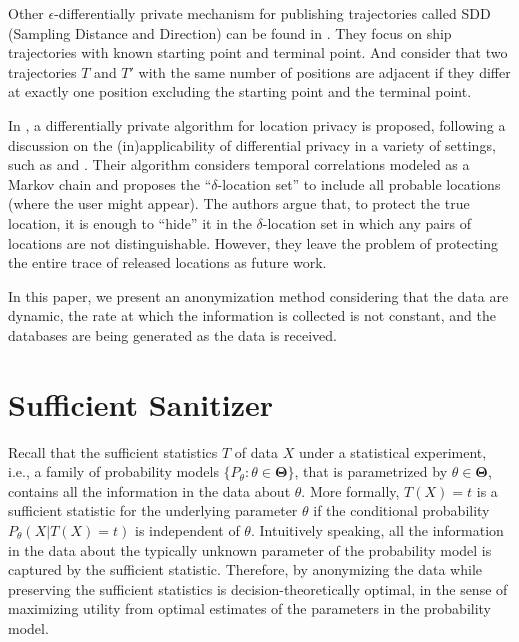 \documentclass{llncs}
\begin{document}
Other $\epsilon$-differentially private mechanism for publishing trajectories called SDD (Sampling Distance and Direction) can be found in \cite{Jiang:2013}.
They focus on ship trajectories with known starting point and terminal point.
And consider that two trajectories $T$ and $T'$ with the same number of positions are adjacent if they differ at exactly one position excluding the starting point and the terminal point.


In \cite{Xiao:2015}, a differentially private algorithm for location privacy is proposed, following a discussion on the (in)applicability of differential privacy in a variety of settings, such as \cite{Chatzik:2013} and  \cite{Kifer:2011}.
Their algorithm considers temporal correlations modeled as a Markov chain and proposes the ``$\delta$-location set'' to include all probable locations (where the user might appear). The authors argue that, to protect the true location, it is enough to “hide” it in the $\delta$-location set in which any pairs of locations are not distinguishable.
However, they leave the problem of protecting the entire trace of released locations as future work.


In this paper, we present an anonymization method considering that the data are dynamic, the rate at which the information is collected is not constant, and the databases are being generated as the data is received.


\section{Sufficient Sanitizer}\label{S:SufficientSanitizer}

Recall that the sufficient statistics $T$ of data $X$ under a statistical experiment, i.e., a family of probability models $\{P_{\theta}: \theta \in \mathbf{\Theta}\}$, that is parametrized by $\theta \in \mathbf{\Theta}$, contains all the information in the data about $\theta$.  
More formally, $T(X)=t$ is a sufficient statistic for the underlying parameter $\theta$ if the conditional probability $P_{\theta}(X | T(X)=t)$ is independent of $\theta$.  
Intuitively speaking, all the information in the data about the typically unknown parameter of the probability model is captured by the sufficient statistic.  
Therefore, by anonymizing the data while preserving the sufficient statistics is decision-theoretically optimal, in the sense of maximizing utility from optimal estimates of the parameters in the probability model.
\end{document}
